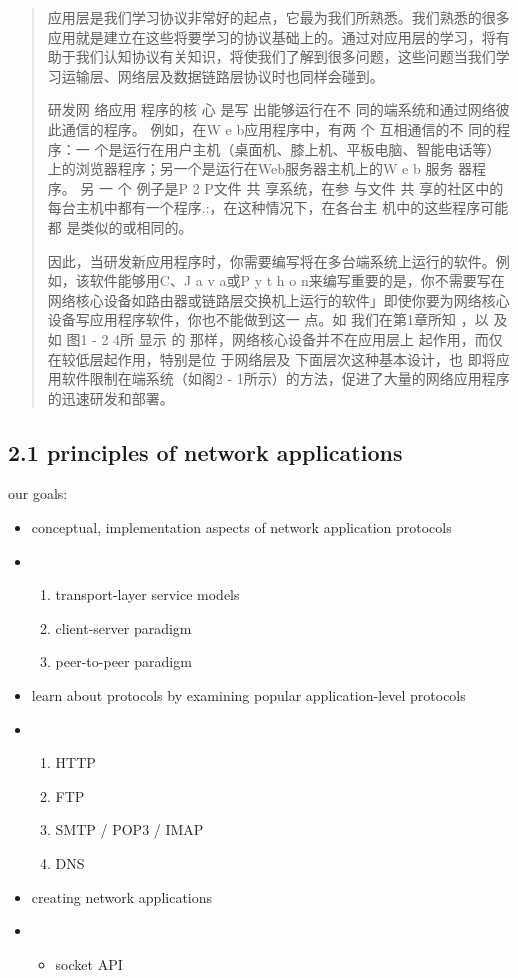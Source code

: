 \documentclass[
]{article}
\begin{document}
\begin{quote}
应用层是我们学习协议非常好的起点，它最为我们所熟悉。我们熟悉的很多应用就是建立在这些将要学习的协议基础上的。通过对应用层的学习，将有助于我们认知协议有关知识，将使我们了解到很多问题，这些问题当我们学习运输层、网络层及数据链路层协议时也同样会碰到。

研发网 络应用 程序的核 心 是写 出能够运行在不
同的端系统和通过网络彼此通信的程序。 例如，在W e b应用程序中，有两 个
互相通信的不 同的程序：一
个是运行在用户主机（桌面机、膝上机、平板电脑、智能电话等）上的浏览器程序；另一个是运行在Web服务器主机上的W
e b 服务 器程序。 另 一 个 例子是P 2 P文件 共 享系统，在参 与文件 共
享的社区中的每台主机中都有一个程序.:，在这种情况下，在各台主
机中的这些程序可能都 是类似的或相同的。

因此，当研发新应用程序时，你需要编写将在多台端系统上运行的软件。例如，该软件能够用C、J
a v a或P y t h o
n来编写重要的是，你不需要写在网络核心设备如路由器或链路层交换机上运行的软件」即使你要为网络核心设备写应用程序软件，你也不能做到这一
点。如 我们在第1章所知 ，以 及如 图1 - 2 4所 显示 的
那样，网络核心设备并不在应用层上 起作用，而仅在较低层起作用，特别是位
于网络层及 下面层次这种基本设计，也 即将应用软件限制在端系统（如阁2 -
1所示）的方法，促进了大量的网络应用程序的迅速研发和部署。
\end{quote}

\hypertarget{21-principles-of-network-applications}{%
\subsection{2.1 principles of network
applications}\label{21-principles-of-network-applications}}

our goals:

\begin{itemize}
\item
  conceptual, implementation aspects of network application protocols
\item
  \begin{enumerate}
  \def\labelenumi{\arabic{enumi}.}
  \item
    transport-layer service models
  \item
    client-server paradigm
  \item
    peer-to-peer paradigm
  \end{enumerate}
\item
  learn about protocols by examining popular application-level protocols
\item
  \begin{enumerate}
  \def\labelenumi{\arabic{enumi}.}
  \item
    HTTP
  \item
    FTP
  \item
    SMTP / POP3 / IMAP
  \item
    DNS
  \end{enumerate}
\item
  creating network applications
\item
  \begin{itemize}
  \item
    socket API
  \end{itemize}
\end{itemize}
\end{document}
